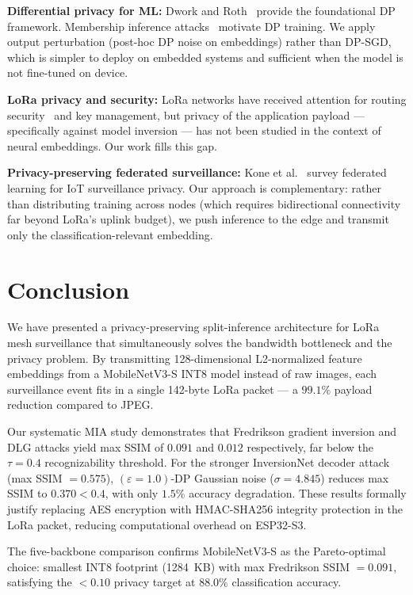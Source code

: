 \documentclass[journal]{IEEEtran}
\newcommand{\eps}{\varepsilon}
\newcommand{\MN}{MobileNetV3-S\xspace}
\begin{document}
\textbf{Differential privacy for ML:}
Dwork and Roth~\cite{Dwork2014} provide the foundational DP framework.
Membership inference attacks~\cite{Shokri2017} motivate DP training.
We apply output perturbation (post-hoc DP noise on embeddings) rather
than DP-SGD, which is simpler to deploy on embedded systems
and sufficient when the model is not fine-tuned on device.

\textbf{LoRa privacy and security:}
LoRa networks have received attention for routing
security~\cite{LoRaMesher2023} and key management, but privacy
of the application payload --- specifically against model inversion ---
has not been studied in the context of neural embeddings.
Our work fills this gap.

\textbf{Privacy-preserving federated surveillance:}
Kone et al.~\cite{Kone2023} survey federated learning for IoT
surveillance privacy.
Our approach is complementary: rather than distributing training
across nodes (which requires bidirectional connectivity far beyond
LoRa's uplink budget), we push inference to the edge and transmit
only the classification-relevant embedding.

\section{Conclusion}
\label{sec:conclusion}

We have presented a privacy-preserving split-inference architecture
for LoRa mesh surveillance that simultaneously solves the bandwidth
bottleneck and the privacy problem.
By transmitting 128-dimensional L2-normalized feature embeddings from
a \MN INT8 model instead of raw images, each surveillance event
fits in a single 142-byte LoRa packet --- a $99.1\%$ payload reduction
compared to JPEG.

Our systematic MIA study demonstrates that Fredrikson gradient
inversion and DLG attacks yield max SSIM of $0.091$ and $0.012$
respectively, far below the $\tau = 0.4$ recognizability threshold.
For the stronger InversionNet decoder attack (max SSIM $= 0.575$),
$(\eps=1.0)$-DP Gaussian noise ($\sigma=4.845$) reduces max SSIM
to $0.370 < 0.4$, with only $1.5\%$ accuracy degradation.
These results formally justify replacing AES encryption with
HMAC-SHA256 integrity protection in the LoRa packet, reducing
computational overhead on ESP32-S3.

The five-backbone comparison confirms \MN as the Pareto-optimal
choice: smallest INT8 footprint (\SI{1284}{KB}) with max Fredrikson
SSIM $= 0.091$, satisfying the $< 0.10$ privacy target at $88.0\%$
classification accuracy.
\end{document}
